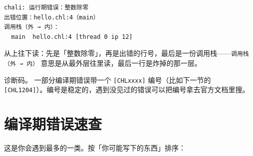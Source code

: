\par
\medskip
\begin{lstlisting}[style=out]
chali: 运行期错误：整数除零
出错位置：hello.chl:4（main）
调用栈（外 → 内）：
  main  hello.chl:4 [thread 0 ip 12]
\end{lstlisting}
\par
\medskip

从上往下读：先是「整数除零」，再是出错的行号，最后是一份调用栈——\texttt{调用栈（外 → 内）} 意思是从最外层往里读，最后一行是炸掉的那一层。

诊断码。 一部分编译期错误带一个 \texttt{[\allowbreak{}CHLxxxx]\allowbreak{}} 编号（比如下一节的 \texttt{[\allowbreak{}CHL1204]\allowbreak{}}）。编号是稳定的，遇到没见过的错误可以把编号拿去官方文档里搜。

\section{编译期错误速查}

这是你会遇到最多的一类。按「你可能写下的东西」排序：

